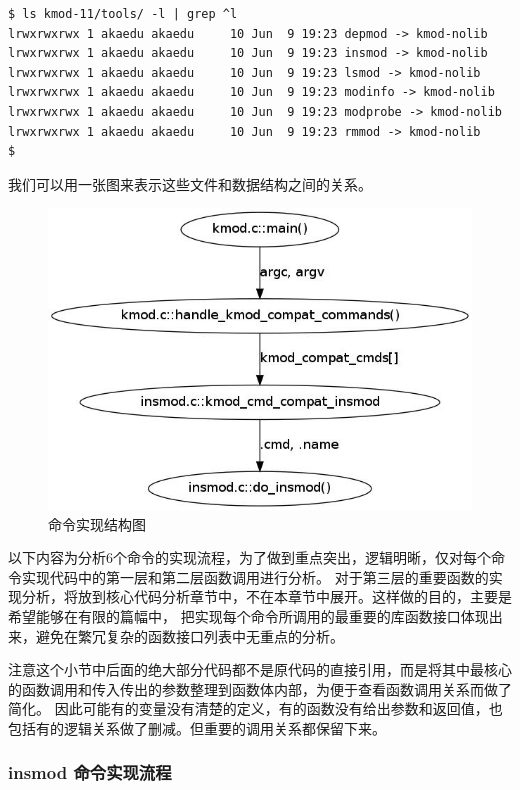 \documentclass[11pt,a4paper]{article}
\makeatletter
\def\maxwidth{\ifdim\Gin@nat@width>\linewidth\linewidth
\else\Gin@nat@width\fi}
\let\Oldincludegraphics\includegraphics
\renewcommand{\includegraphics}[1]{\Oldincludegraphics[width=\maxwidth]{#1}}
\makeatother
\begin{document}
{\begin{shaded}\begin{verbatim}
$ ls kmod-11/tools/ -l | grep ^l
lrwxrwxrwx 1 akaedu akaedu     10 Jun  9 19:23 depmod -> kmod-nolib
lrwxrwxrwx 1 akaedu akaedu     10 Jun  9 19:23 insmod -> kmod-nolib
lrwxrwxrwx 1 akaedu akaedu     10 Jun  9 19:23 lsmod -> kmod-nolib
lrwxrwxrwx 1 akaedu akaedu     10 Jun  9 19:23 modinfo -> kmod-nolib
lrwxrwxrwx 1 akaedu akaedu     10 Jun  9 19:23 modprobe -> kmod-nolib
lrwxrwxrwx 1 akaedu akaedu     10 Jun  9 19:23 rmmod -> kmod-nolib
$ 
\end{verbatim}\end{shaded}}
我们可以用一张图来表示这些文件和数据结构之间的关系。

\begin{figure}[htbp]
\centering
\includegraphics{./figures/cmd.jpg}
\caption{命令实现结构图}
\end{figure}

以下内容为分析6个命令的实现流程，为了做到重点突出，逻辑明晰，仅对每个命令实现代码中的第一层和第二层函数调用进行分析。
对于第三层的重要函数的实现分析，将放到核心代码分析章节中，不在本章节中展开。这样做的目的，主要是希望能够在有限的篇幅中，
把实现每个命令所调用的最重要的库函数接口体现出来，避免在繁冗复杂的函数接口列表中无重点的分析。

注意这个小节中后面的绝大部分代码都不是原代码的直接引用，而是将其中最核心的函数调用和传入传出的参数整理到函数体内部，为便于查看函数调用关系而做了简化。
因此可能有的变量没有清楚的定义，有的函数没有给出参数和返回值，也包括有的逻辑关系做了删减。但重要的调用关系都保留下来。

\subsubsection{insmod 命令实现流程}
\end{document}
